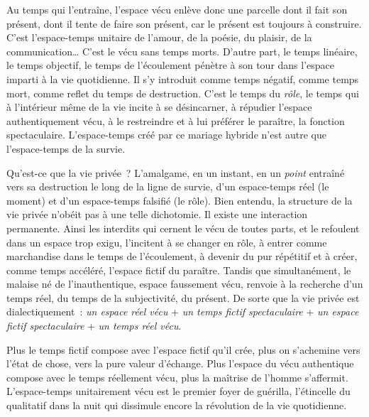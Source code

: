 \documentclass[french,twoside]{book} %
\begin{document}
Au temps qui l’entraîne, l’espace vécu enlève donc une parcelle dont il fait son présent, dont il tente de faire son présent, car le présent est toujours à construire. C’est l’espace-temps unitaire de l’amour, de la poésie, du plaisir, de la communication… C’est le vécu sans temps morts. D’autre part, le temps linéaire, le temps objectif, le temps de l’écoulement pénètre à son tour dans l’espace imparti à la vie quotidienne. Il s’y introduit comme temps négatif, comme temps mort, comme reflet du temps de destruction. C’est le temps du \emph{rôle}, le temps qui à l’intérieur même de la vie incite à se désincarner, à répudier l’espace authentiquement vécu, à le restreindre et à lui préférer le paraître, la fonction spectaculaire. L’espace-temps créé par ce mariage hybride n’est autre que l’espace-temps de la survie.\par
Qu’est-ce que la vie privée ? L’amalgame, en un instant, en un \emph{point} entraîné vers sa destruction le long de la ligne de survie, d’un espace-temps réel (le moment) et d’un espace-temps falsifié (le rôle). Bien entendu, la structure de la vie privée n’obéit pas à une telle dichotomie. Il existe une interaction permanente. Ainsi les interdits qui cernent le vécu de toutes parts, et le refoulent dans un espace trop exigu, l’incitent à se changer en rôle, à entrer comme marchandise dans le temps de l’écoulement, à devenir du pur répétitif et à créer, comme temps accéléré, l’espace fictif du paraître. Tandis que simultanément, le malaise né de l’inauthentique, espace faussement vécu, renvoie à la recherche d’un temps réel, du temps de la subjectivité, du présent. De sorte que la vie privée est dialectiquement : \emph{un espace réel vécu} + \emph{un temps fictif spectaculaire} + \emph{un espace fictif spectaculaire} + \emph{un temps réel vécu}.\par
Plus le temps fictif compose avec l’espace fictif qu’il crée, plus on s’achemine vers l’état de chose, vers la pure valeur d’échange. Plus l’espace du vécu authentique compose avec le temps réellement vécu, plus la maîtrise de l’homme s’affermit. L’espace-temps unitairement vécu est le premier foyer de guérilla, l’étincelle du qualitatif dans la nuit qui dissimule encore la révolution de la vie quotidienne.\par
\end{document}
